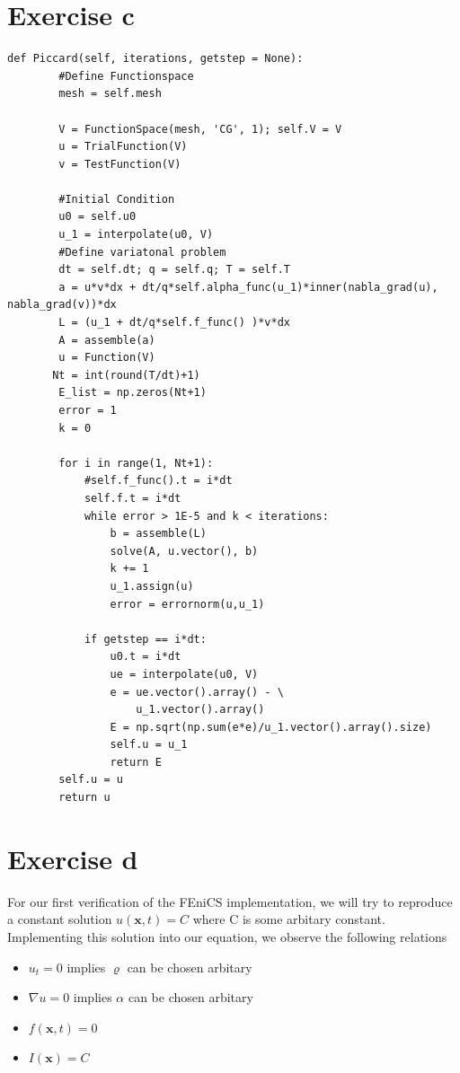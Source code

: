 \documentclass[a4paper,norsk]{article}
\begin{document}
\section*{Exercise c}
\begin{lstlisting}[style=codesnippet]
    def Piccard(self, iterations, getstep = None):
    	#Define Functionspace
        mesh = self.mesh

    	V = FunctionSpace(mesh, 'CG', 1); self.V = V
    	u = TrialFunction(V)
    	v = TestFunction(V)

		#Initial Condition    	
    	u0 = self.u0
    	u_1 = interpolate(u0, V)
    	#Define variatonal problem
        dt = self.dt; q = self.q; T = self.T
    	a = u*v*dx + dt/q*self.alpha_func(u_1)*inner(nabla_grad(u), nabla_grad(v))*dx
    	L = (u_1 + dt/q*self.f_func() )*v*dx
    	A = assemble(a)
    	u = Function(V)
       Nt = int(round(T/dt)+1)
        E_list = np.zeros(Nt+1)
    	error = 1
    	k = 0
 
        for i in range(1, Nt+1):
            #self.f_func().t = i*dt 
            self.f.t = i*dt
            while error > 1E-5 and k < iterations:  
                b = assemble(L)
                solve(A, u.vector(), b)
                k += 1
                u_1.assign(u) 
                error = errornorm(u,u_1)

            if getstep == i*dt:
                u0.t = i*dt
                ue = interpolate(u0, V)
                e = ue.vector().array() - \
                    u_1.vector().array()
                E = np.sqrt(np.sum(e*e)/u_1.vector().array().size)
                self.u = u_1
                return E
        self.u = u 
        return u
\end{lstlisting}

\section*{Exercise d}
For our first verification of the FEniCS implementation, we will try to reproduce a constant solution $u(\textbf{x},t) = C$ where C is some arbitary constant. Implementing this solution into our equation, we observe the following relations

\begin{itemize}
\item \hspace{1mm}$u_t = 0$ \hspace{5mm} implies $\varrho$ can be chosen arbitary
\item $\nabla u = 0$ \hspace{3mm} implies $\alpha$ can be chosen arbitary
\item $f(\textbf{x},t) = 0$
\item $I(\textbf{x}) = C$
\end{itemize}
\end{document}
